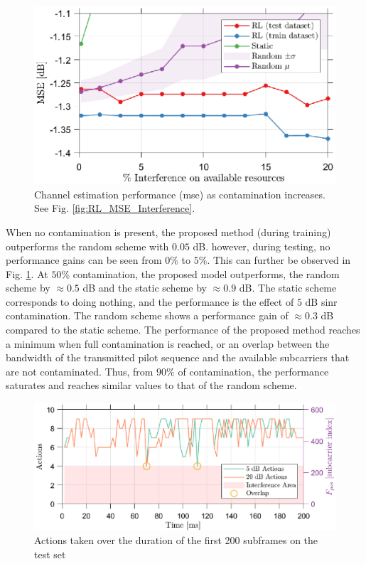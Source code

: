 \begin{figure}
    \centering
    \includegraphics{chapters/part_uplink/figures/results/MSE_Interference_zoomedin.eps}
    \caption{Channel estimation performance (\gls{mse}) as contamination increases. See Fig. \ref{fig:RL_MSE_Interference}.}
    \label{fig:RL_MSE_Interference_zoomedin}
\end{figure}

When no contamination is present, the proposed method (during training) outperforms the random scheme with $0.05$ dB. however, during testing, no performance gains can be seen from $0\%$ to $5\%$. This can further be observed in Fig. \ref{fig:RL_MSE_Interference_zoomedin}. At $50\%$ contamination, the proposed model outperforms, the random scheme by $\approx 0.5$ dB and the static scheme by $\approx 0.9$ dB. The static scheme corresponds to doing nothing, and the performance is the effect of $5$ dB \gls{sinr} contamination. The random scheme shows a performance gain of $\approx 0.3$ dB compared to the static scheme. The performance of the proposed method reaches a minimum when full contamination is reached, or an overlap between the bandwidth of the transmitted pilot sequence and the available subcarriers that are not contaminated. Thus, from $90\%$ of contamination, the performance saturates and reaches similar values to that of the random scheme. 

\begin{figure}
    \centering
    \includegraphics{chapters/part_uplink/figures/results/action_timeseries.eps}
    \caption{Actions taken over the duration of the first 200 subframes on the test set}
    \label{fig:RL_action_timeseries}
\end{figure}

